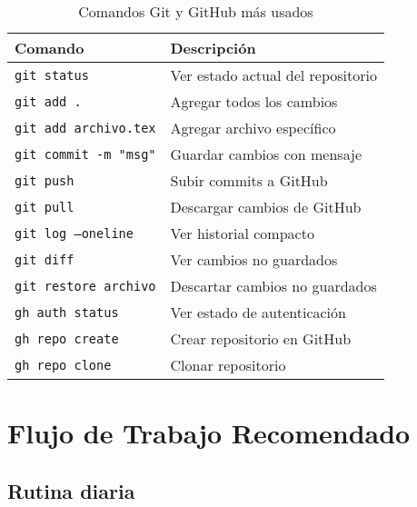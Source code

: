 \documentclass[11pt,a4paper]{article}
\begin{document}
\begin{table}[h!]
\centering
\small
\begin{tabular}{|l|p{8cm}|}
\hline
\textbf{Comando} & \textbf{Descripción} \\
\hline
\texttt{git status} & Ver estado actual del repositorio \\
\hline
\texttt{git add .} & Agregar todos los cambios \\
\hline
\texttt{git add archivo.tex} & Agregar archivo específico \\
\hline
\texttt{git commit -m "msg"} & Guardar cambios con mensaje \\
\hline
\texttt{git push} & Subir commits a GitHub \\
\hline
\texttt{git pull} & Descargar cambios de GitHub \\
\hline
\texttt{git log --oneline} & Ver historial compacto \\
\hline
\texttt{git diff} & Ver cambios no guardados \\
\hline
\texttt{git restore archivo} & Descartar cambios no guardados \\
\hline
\texttt{gh auth status} & Ver estado de autenticación \\
\hline
\texttt{gh repo create} & Crear repositorio en GitHub \\
\hline
\texttt{gh repo clone} & Clonar repositorio \\
\hline
\end{tabular}
\caption{Comandos Git y GitHub más usados}
\end{table}

\section{Flujo de Trabajo Recomendado}

\subsection{Rutina diaria}
\end{document}
